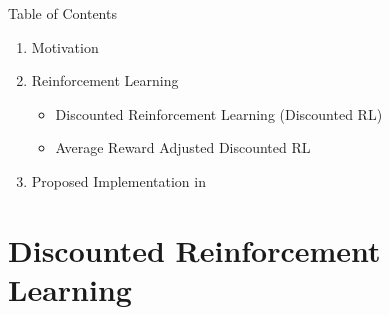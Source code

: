 \documentclass[xcolor=table%
,t]{beamer}
\begin{document}
\begin{frame}[t]
  \frametitle{\inserttitle{}}
  \begin{block}{Table of Contents}
    \vspace{0.2cm}
    \begin{enumerate}
    \item Motivation
      
    \item Reinforcement Learning
      \begin{itemize}
      \item Discounted Reinforcement Learning (Discounted RL)
      \item Average Reward Adjusted Discounted RL
      \end{itemize}
    \item Proposed Implementation in \tct{}
    \end{enumerate}
  \end{block}
\end{frame}

\section{Discounted Reinforcement Learning}
\label{sec:Discounted_Reinforcement_Learning}
\end{document}
